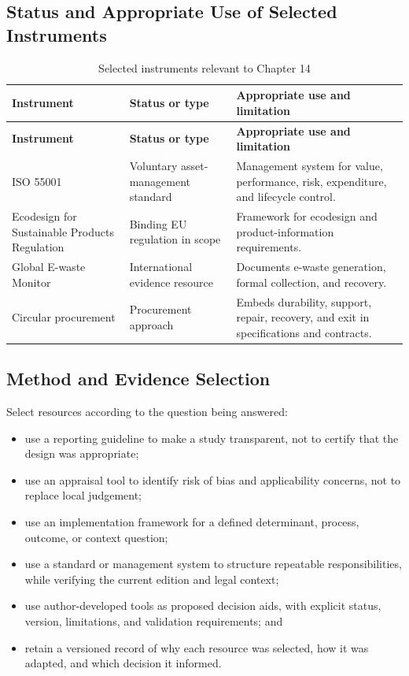 \subsection{Status and Appropriate Use of Selected Instruments}
\begin{longtable}{@{}p{}p{}p{}@{}}
\caption{Selected instruments relevant to Chapter 14}
\label{tab:comp-ch14-instrument-status}\\
\toprule
\textbf{Instrument} & \textbf{Status or type} & \textbf{Appropriate use and limitation} \\
\midrule
\endfirsthead
\toprule
\textbf{Instrument} & \textbf{Status or type} & \textbf{Appropriate use and limitation} \\
\midrule
\endhead
\bottomrule
\endlastfoot
ISO 55001 & Voluntary asset-management standard & Management system for value, performance, risk, expenditure, and lifecycle control. \\
Ecodesign for Sustainable Products Regulation & Binding EU regulation in scope & Framework for ecodesign and product-information requirements. \\
Global E-waste Monitor & International evidence resource & Documents e-waste generation, formal collection, and recovery. \\
Circular procurement & Procurement approach & Embeds durability, support, repair, recovery, and exit in specifications and contracts. \\
\end{longtable}

\subsection{Method and Evidence Selection}
Select resources according to the question being answered:
\begin{itemize}
 \item use a reporting guideline to make a study transparent, not to certify that the design was appropriate;
 \item use an appraisal tool to identify risk of bias and applicability concerns, not to replace local judgement;
 \item use an implementation framework for a defined determinant, process, outcome, or context question;
 \item use a standard or management system to structure repeatable responsibilities, while verifying the current edition and legal context;
 \item use author-developed tools as proposed decision aids, with explicit status, version, limitations, and validation requirements; and
 \item retain a versioned record of why each resource was selected, how it was adapted, and which decision it informed.
\end{itemize}

